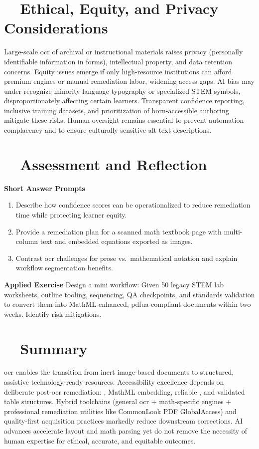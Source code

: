\section{~~Ethical, Equity, and Privacy Considerations}
\label{sec:ocr-ethics}
Large-scale \gls{ocr} of archival or instructional materials raises privacy (personally identifiable information in forms), intellectual property, and data retention concerns. Equity issues emerge if only high-resource institutions can afford premium engines or manual remediation labor, widening access gaps. AI bias may under-recognize minority language typography or specialized STEM symbols, disproportionately affecting certain learners. Transparent confidence reporting, inclusive training datasets, and prioritization of born-accessible authoring mitigate these risks. Human oversight remains essential to prevent automation complacency and to ensure culturally sensitive alt text descriptions.

\section{~~Assessment and Reflection}
\label{sec:ocr-assessment}
\textbf{Short Answer Prompts}
\begin{enumerate}
	\item Describe how confidence scores can be operationalized to reduce remediation time while protecting learner equity.
	\item Provide a remediation plan for a scanned math textbook page with multi-column text and embedded equations exported as images.
	\item Contrast \gls{ocr} challenges for prose vs.\ mathematical notation and explain workflow segmentation benefits.
\end{enumerate}
\textbf{Applied Exercise} Design a mini workflow: Given 50 legacy STEM lab worksheets, outline tooling, sequencing, QA checkpoints, and standards validation to convert them into MathML-enhanced, \gls{pdfua}-compliant documents within two weeks. Identify risk mitigations.

\section{~~Summary}
\label{sec:ocr-summary}
\gls{ocr} enables the transition from inert image-based documents to structured, assistive technology-ready resources. Accessibility excellence depends on deliberate post-\gls{ocr} remediation: , MathML embedding, reliable , and validated table structures. Hybrid toolchains (general \gls{ocr} + math-specific engines + professional remediation utilities like CommonLook PDF GlobalAccess\supercite{AllyantCommonLook}) and quality-first acquisition practices markedly reduce downstream corrections. AI advances accelerate layout and math parsing yet do not remove the necessity of human expertise for ethical, accurate, and equitable outcomes.

